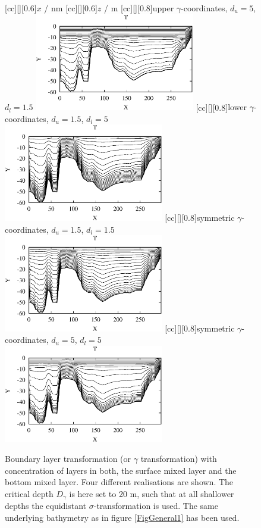 \begin{figure}
\begin{center}
[cc][][0.6]{$x$ / nm}
[cc][][0.6]{$z$ / m}
[cc][][0.8]{upper $\gamma$-coordinates, $d_u=5$, $d_l=1.5$}
\includegraphics[width=7cm,bbllx=50,bblly=50,bburx=529,bbury=346]{./figures/gammauplow.ps}
[cc][][0.8]{lower $\gamma$-coordinates, $d_u=1.5$, $d_l=5$}
\includegraphics[width=7cm,bbllx=50,bblly=50,bburx=529,bbury=346]{./figures/gammalowup.ps}
[cc][][0.8]{symmetric $\gamma$-coordinates, $d_u=1.5$, $d_l=1.5$}
\includegraphics[width=7cm,bbllx=50,bblly=50,bburx=529,bbury=346]{./figures/gammauplow1.ps}
[cc][][0.8]{symmetric $\gamma$-coordinates, $d_u=5$, $d_l=5$}
\includegraphics[width=7cm,bbllx=50,bblly=50,bburx=529,bbury=346]{./figures/gammauplow5.ps}
\caption{
Boundary layer transformation (or $\gamma$ transformation)
with concentration of layers in both, 
the surface mixed layer and
the bottom mixed layer.  Four different realisations are shown. 
The critical depth $D_{\gamma}$ is here set to 20 m,
such that at all shallower depths the equidistant $\sigma$-transformation
is used.
The same underlying bathymetry as in figure \ref{FigGeneral1} 
has been used. 
}\label{FigGeneral3}
\end{center}
\end{figure}


